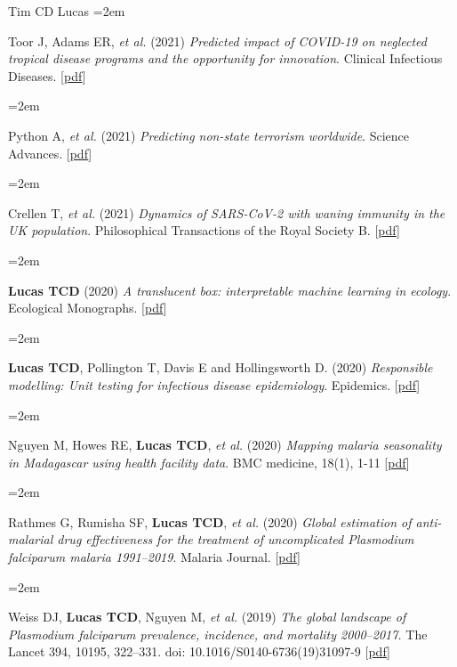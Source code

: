 \documentclass{scrartcl}
\newcommand{\MarginText}[1]{\marginpar{\raggedleft\itshape\small#1}} %
\newcommand{\Description}[1]{\hangindent=2em\hangafter=0\noindent\raggedright\footnotesize{#1}\par\normalsize\vspace{1em}} %
\begin{document}
\begin{cv}{Tim {\Large CD} Lucas}
\Description{Toor J, Adams ER, \emph{et al.} (2021) \emph{Predicted impact of COVID-19 on neglected tropical disease programs and the opportunity for innovation}. Clinical Infectious Diseases. [\href{https://www.ncbi.nlm.nih.gov/pmc/articles/PMC7543306/}{pdf}]}


\Description{Python A, \emph{et al.} (2021) \emph{Predicting non-state terrorism worldwide}. Science Advances. [\href{https://www.science.org/doi/full/10.1126/sciadv.abg4778}{pdf}]}


\Description{Crellen T, \emph{et al.} (2021) \emph{Dynamics of SARS-CoV-2 with waning immunity in the UK population}. Philosophical Transactions of the Royal Society B. [\href{https://royalsocietypublishing.org/doi/full/10.1098/rstb.2020.0274}{pdf}]}






\Description{\MarginText{2020}\textbf{Lucas TCD} (2020) \emph{A translucent box: interpretable machine learning in ecology}. Ecological Monographs. [\href{https://esajournals.onlinelibrary.wiley.com/doi/epdf/10.1002/ecm.1422}{pdf}]}




\Description{\textbf{Lucas TCD}, Pollington T, Davis E and Hollingsworth D. (2020) \emph{Responsible modelling: Unit testing for infectious disease epidemiology}. Epidemics. [\href{https://www.sciencedirect.com/science/article/pii/S1755436520300451}{pdf}]}



\Description{Nguyen M, Howes RE, \textbf{Lucas TCD},  \emph{et al.} (2020) \emph{Mapping malaria seasonality in Madagascar using health facility data}. BMC medicine, 18(1), 1-11 [\href{https://bmcmedicine.biomedcentral.com/track/pdf/10.1186/s12916-019-1486-3}{pdf}]}


\Description{Rathmes G, Rumisha SF, \textbf{Lucas TCD}, \emph{et al.} (2020) \emph{Global estimation of anti-malarial drug effectiveness for the treatment of uncomplicated \emph{Plasmodium falciparum} malaria 1991--2019}. Malaria Journal. [\href{https://link.springer.com/article/10.1186/s12936-020-03446-8}{pdf}]}



\Description{\MarginText{2019}Weiss DJ, \textbf{Lucas TCD}, Nguyen M, \emph{et al.} (2019) \emph{The global landscape of \emph{Plasmodium falciparum} prevalence, incidence, and mortality 2000--2017.} The Lancet 394, 10195, 322--331. doi: 10.1016/S0140-6736(19)31097-9 [\href{https://doi.org/10.1016/S0140-6736(19)31097-9}{pdf}]}


\end{cv}
\end{document}
